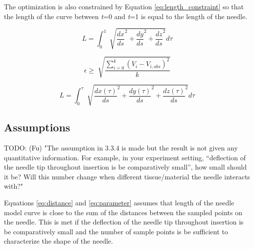 The optimization is also constrained by Equation \ref{eq:length_constraint} so that the length of the curve between \textit{t}=0 and \textit{t}=1 is equal to the length of the needle.

\begin{equation}
\label{eq:length_constraint}
L = \int_0^1 \sqrt[]{\frac{dx}{ds}^2 + \frac{dy}{ds}^2 + \frac{dz}{ds}^2} d\tau
\end{equation}

\begin{equation}
\label{eq:rsme_constraint}
\epsilon \geq \sqrt[]{\frac{\sum_{i=0}^{k}(V_i - V_{i, obs})^2}{k}}
\end{equation}

\begin{equation}
\label{eq:length_calculation}
L = \int_0^\tau \sqrt[]{\frac{dx(\tau)}{ds}^2 + \frac{dy(\tau)}{ds}^2 + \frac{dz(\tau)}{ds}^2} d\tau
\end{equation}



\subsection{Assumptions}

TODO: (Fu) "The assumption in 3.3.4 is made but the result is not given any quantitative information. For example, in your experiment setting, “deflection of the needle tip throughout insertion is be comparatively small”, how small should it be? Will this number change when different tissue/material the needle interacts with?"

Equations \ref{eq:distance} and \ref{eq:parameter} assumes that length of the needle model curve is close to the sum of the distances between the sampled points on the needle. This is met if the deflection of the needle tip throughout insertion is be comparatively small and the number of sample points is be sufficient to characterize the shape of the needle.


